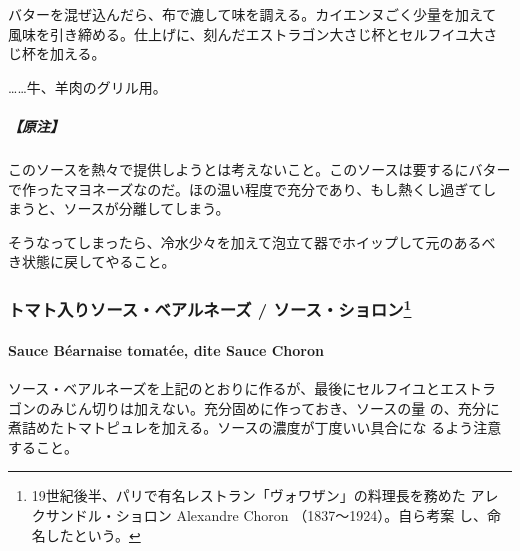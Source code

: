 \begin{recette}
バターを混ぜ込んだら、布で漉して味を調える。カイエンヌごく少量を加えて
風味を引き締める。仕上げに、刻んだエストラゴン大さじ杯とセルフイユ大さ
じ\undemi{}杯を加える。

\ldots{}\ldots{}牛、羊肉のグリル用。

\hypertarget{ux539fux6ce8}{%
\subparagraph{【原注】}\label{ux539fux6ce8}}

このソースを熱々で提供しようとは考えないこと。このソースは要するにバター
で作ったマヨネーズなのだ。ほの温い程度で充分であり、もし熱くし過ぎてし
まうと、ソースが分離してしまう。

そうなってしまったら、冷水少々を加えて泡立て器でホイップして元のあるべ
き状態に戻してやること。

\maeaki

\hypertarget{ux30c8ux30deux30c8ux5165ux308aux30bdux30fcux30b9ux30d9ux30a2ux30ebux30cdux30fcux30ba-ux30bdux30fcux30b9ux30b7ux30e7ux30edux30f310}{%
\subsubsection[トマト入りソース・ベアルネーズ /
ソース・ショロン]{\texorpdfstring{トマト入りソース・ベアルネーズ /
ソース・ショロン\footnote{19世紀後半、パリで有名レストラン「ヴォワザン」の料理長を務めた
  アレクサンドル・ショロン Alexandre Choron （1837〜1924）。自ら考案
  し、命名したという。}}{トマト入りソース・ベアルネーズ / ソース・ショロン}}\label{ux30c8ux30deux30c8ux5165ux308aux30bdux30fcux30b9ux30d9ux30a2ux30ebux30cdux30fcux30ba-ux30bdux30fcux30b9ux30b7ux30e7ux30edux30f310}}

\hypertarget{sauce-bearnaise-tomatee}{%
\paragraph{Sauce Béarnaise tomatée, dite Sauce
Choron}\label{sauce-bearnaise-tomatee}}


ソース・ベアルネーズを上記のとおりに作るが、最後にセルフイユとエストラ
ゴンのみじん切りは加えない。充分固めに作っておき、ソースの\unquart{}量
の、充分に煮詰めたトマトピュレを加える。ソースの濃度が丁度いい具合にな
るよう注意すること。


\end{recette}
